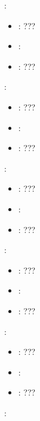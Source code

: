 \begin{itemize}
{    \item {}:
           \begin{itemize}
                \item \optionPossibleValues{}: ???
                \item \optionDefaultValue{}: 
                \item \optionDescrption{}: ???
           \end{itemize}
    \item {}:
           \begin{itemize}
                \item \optionPossibleValues{}: ???
                \item \optionDefaultValue{}: 
                \item \optionDescrption{}: ???
           \end{itemize}
    \item {}:
           \begin{itemize}
                \item \optionPossibleValues{}: ???
                \item \optionDefaultValue{}: 
                \item \optionDescrption{}: ???
           \end{itemize}
    \item {}:
           \begin{itemize}
                \item \optionPossibleValues{}: ???
                \item \optionDefaultValue{}: 
                \item \optionDescrption{}: ???
           \end{itemize}
    \item {}:
           \begin{itemize}
                \item \optionPossibleValues{}: ???
                \item \optionDefaultValue{}: 
                \item \optionDescrption{}: ???
           \end{itemize}
    \item {}:
}
\end{itemize}
